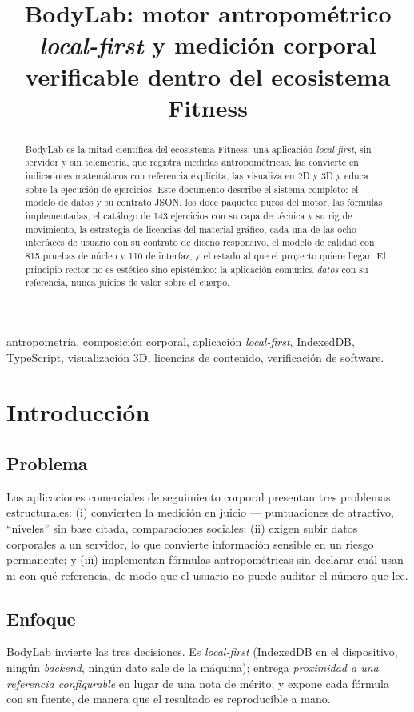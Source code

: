 \documentclass[conference]{IEEEtran}
\title{BodyLab: motor antropom\'etrico \emph{local-first} y medici\'on corporal verificable dentro del ecosistema Fitness}
\author{
\IEEEauthorblockN{Alejandro Buend\'ia}
\IEEEauthorblockA{Proyecto Fitness --- BodyLab \& TrainingLab\\
Repositorio: \url{https://github.com/SCP-00/Fitness}\\
Proyecto personal de c\'odigo abierto}
}
\begin{document}
\maketitle

\begin{abstract}
BodyLab es la mitad cient\'ifica del ecosistema Fitness: una aplicaci\'on
\emph{local-first}, sin servidor y sin telemetr\'ia, que registra medidas
antropom\'etricas, las convierte en indicadores matem\'aticos con referencia
expl\'icita, las visualiza en 2D y 3D y educa sobre la ejecuci\'on de ejercicios.
Este documento describe el sistema completo: el modelo de datos y su contrato
JSON, los doce paquetes puros del motor, las f\'ormulas implementadas, el
cat\'alogo de 143 ejercicios con su capa de t\'ecnica y su rig de movimiento, la
estrategia de licencias del material gr\'afico, cada una de las ocho interfaces
de usuario con su contrato de dise\~no responsivo, el modelo de calidad con 815
pruebas de n\'ucleo y 110 de interfaz, y el estado al que el proyecto quiere
llegar. El principio rector no es est\'etico sino epist\'emico: la aplicaci\'on
comunica \emph{datos} con su referencia, nunca juicios de valor sobre el cuerpo.
\end{abstract}

\begin{IEEEkeywords}
antropometr\'ia, composici\'on corporal, aplicaci\'on \emph{local-first},
IndexedDB, TypeScript, visualizaci\'on 3D, licencias de contenido, verificaci\'on
de software.
\end{IEEEkeywords}

\section{Introducci\'on}

\subsection{Problema}
Las aplicaciones comerciales de seguimiento corporal presentan tres problemas
estructurales: (i) convierten la medici\'on en juicio --- puntuaciones de
atractivo, ``niveles'' sin base citada, comparaciones sociales; (ii) exigen
subir datos corporales a un servidor, lo que convierte informaci\'on sensible en
un riesgo permanente; y (iii) implementan f\'ormulas antropom\'etricas sin
declarar cu\'al usan ni con qu\'e referencia, de modo que el usuario no puede
auditar el n\'umero que lee.

\subsection{Enfoque}
BodyLab invierte las tres decisiones. Es \emph{local-first} (IndexedDB en el
dispositivo, ning\'un \emph{backend}, ning\'un dato sale de la m\'aquina);
entrega \emph{proximidad a una referencia configurable} en lugar de una nota de
m\'erito; y expone cada f\'ormula con su fuente, de manera que el resultado es
reproducible a mano.
\end{document}
